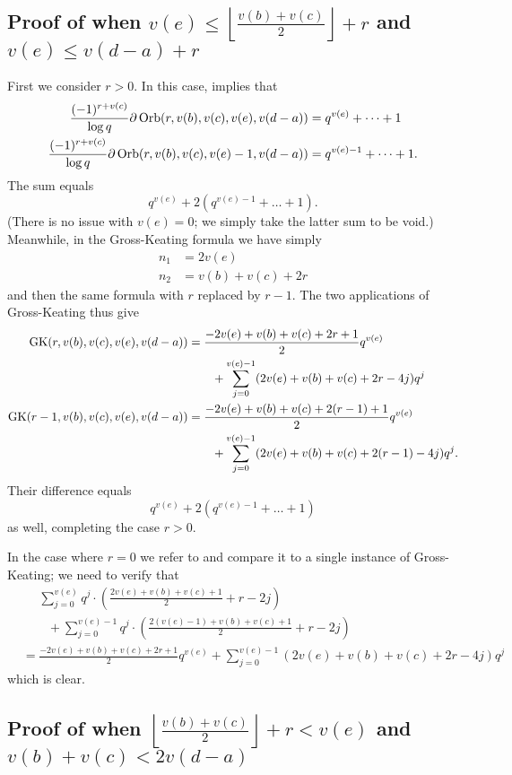 \subsection{Proof of 
  when $v(e) \le \left\lfloor \tfrac{v(b)+v(c)}{2} \right\rfloor + r$
  and $v(e) \le v(d-a) + r$}
First we consider $r > 0$.
In this case,  implies that
\begin{align*}
  \frac{(-1)^{r+v(c)}}{\log q}\partial\operatorname{Orb}(r, v(b), v(c), v(e), v(d-a))
  &= q^{v(e)} + \dots + 1 \\
  \frac{(-1)^{r+v(c)}}{\log q}\partial\operatorname{Orb}(r, v(b), v(c), v(e)-1, v(d-a))
  &= q^{v(e)-1} + \dots + 1.
\end{align*}
The sum equals
\[ q^{v(e)} + 2(q^{v(e)-1} + \dots + 1). \]
(There is no issue with $v(e) = 0$; we simply take the latter sum to be void.)
Meanwhile, in the Gross-Keating formula we have simply
\begin{align*}
  n_1 &= 2v(e) \\
  n_2 &= v(b) + v(c) + 2r
\end{align*}
and then the same formula with $r$ replaced by $r-1$.
The two applications of Gross-Keating thus give
\begin{align*}
  \operatorname{GK}(r, v(b), v(c), v(e), v(d-a))
  &= \frac{-2v(e)+v(b)+v(c)+2r+1}{2} q^{v(e)} \\
  &\qquad+ \sum_{j=0}^{v(e)-1} (2v(e)+v(b)+v(c)+2r-4j) q^j \\
  \operatorname{GK}(r-1, v(b), v(c), v(e), v(d-a))
  &= \frac{-2v(e)+v(b)+v(c)+2(r-1)+1}{2} q^{v(e)} \\
  &\qquad + \sum_{j=0}^{v(e)-1} (2v(e)+v(b)+v(c)+2(r-1)-4j) q^j.
\end{align*}
Their difference equals
\[ q^{v(e)} + 2(q^{v(e)-1} + \dots + 1) \]
as well, completing the case $r > 0$.

In the case where $r = 0$ we refer to 
and compare it to a single instance of Gross-Keating; we need to verify that
\begin{align*}
  &\phantom= \sum_{j=0}^{v(e)} q^j \cdot \left( \frac{2v(e)+v(b)+v(c)+1}{2} + r - 2j \right) \\
  &\qquad+ \sum_{j=0}^{v(e)-1} q^j \cdot \left( \frac{2(v(e)-1)+v(b)+v(c)+1}{2} + r - 2j \right) \\
  &= \frac{-2v(e)+v(b)+v(c)+2r+1}{2} q^{v(e)}
  + \sum_{j=0}^{v(e)-1} (2v(e)+v(b)+v(c)+2r-4j) q^j
\end{align*}
which is clear.

\subsection{Proof of 
  when $\left\lfloor \tfrac{v(b)+v(c)}{2} \right\rfloor + r < v(e)$
  and $v(b)+v(c) < 2v(d-a)$}

